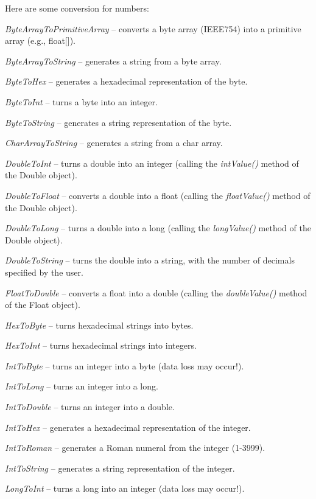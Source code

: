 Here are some conversion for numbers:
\begin{tight_itemize}
	\item \textit{ByteArrayToPrimitiveArray} -- converts a byte array (IEEE754) into a primitive array (e.g., float[]).
	\item \textit{ByteArrayToString} -- generates a string from a byte array.
	\item \textit{ByteToHex} -- generates a hexadecimal representation of the byte.
	\item \textit{ByteToInt} -- turns a byte into an integer.
	\item \textit{ByteToString} -- generates a string representation of the byte.
  \item \textit{CharArrayToString} -- generates a string from a char array.
	\item \textit{DoubleToInt} -- turns a double into an integer (calling the
	\textit{intValue()} method of the Double object).
	\item \textit{DoubleToFloat} -- converts a double into a float (calling the 
	\textit{floatValue()} method of the Double object).
	\item \textit{DoubleToLong} -- turns a double into a long (calling the
	\textit{longValue()} method of the Double object).
	\item \textit{DoubleToString} -- turns the double into a string, with the number
	of decimals specified by the user.
	\item \textit{FloatToDouble} -- converts a float into a double (calling the 
	\textit{doubleValue()} method of the Float object).
	\item \textit{HexToByte} -- turns hexadecimal strings into bytes.
	\item \textit{HexToInt} -- turns hexadecimal strings into integers.
	\item \textit{IntToByte} -- turns an integer into a byte (data loss may occur!).
	\item \textit{IntToLong} -- turns an integer into a long.
	\item \textit{IntToDouble} -- turns an integer into a double.
	\item \textit{IntToHex} -- generates a hexadecimal representation of the integer.
	\item \textit{IntToRoman} -- generates a Roman numeral from the integer (1-3999).
	\item \textit{IntToString} -- generates a string representation of the integer.
	\item \textit{LongToInt} -- turns a long into an integer (data loss may occur!).

\end{tight_itemize}
